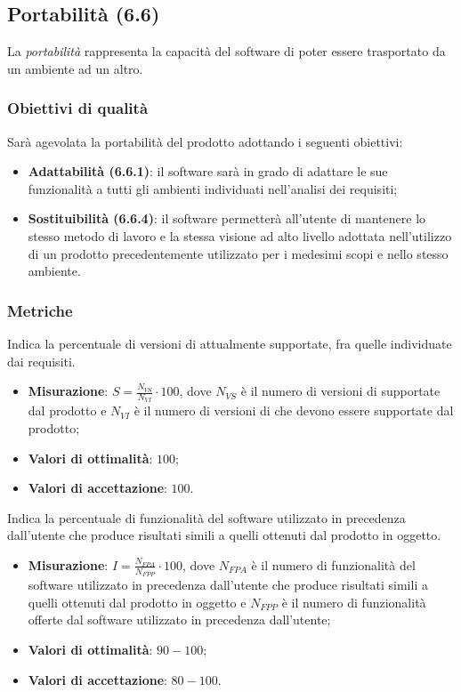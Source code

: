 \subsection{Portabilità (6.6)}
\label{portabilita}
La \emph{portabilità} rappresenta la capacità del software di poter essere trasportato da un ambiente ad un altro.
\subsubsection{Obiettivi di qualità}
Sarà agevolata la portabilità del prodotto adottando i seguenti obiettivi:
\begin{itemize}
\item \textbf{Adattabilità (6.6.1)}: il software sarà in grado di adattare le sue funzionalità a tutti gli ambienti individuati nell'analisi dei requisiti;
\item \textbf{Sostituibilità (6.6.4)}: il software permetterà all'utente di mantenere lo stesso metodo di lavoro e la stessa visione ad alto livello adottata nell'utilizzo di un prodotto precedentemente utilizzato per i medesimi scopi e nello stesso ambiente.
\end{itemize}
\subsubsection{Metriche}
\label{versioniBrowserSupp}
Indica la percentuale di versioni di  attualmente supportate, fra quelle individuate dai requisiti.
\begin{itemize}
\item \textbf{Misurazione}: $S=\frac{N_{VS}}{N_{VI}} \cdot 100$, dove $N_{VS}$ è il numero di versioni di  supportate dal prodotto e $N_{VI}$ è il numero di versioni di  che devono essere supportate dal prodotto;
\item \textbf{Valori di ottimalità}: $100$;
\item \textbf{Valori di accettazione}: $100$.
\end{itemize}
\label{inclFunzAltriProd}
Indica la percentuale di funzionalità del software utilizzato in precedenza dall'utente che produce risultati simili a quelli ottenuti dal prodotto in oggetto.
\begin{itemize}
\item \textbf{Misurazione}: $I=\frac{N_{FPA}}{N_{FPP}} \cdot 100$, dove $N_{FPA}$ è il numero di funzionalità del software utilizzato in precedenza dall'utente che produce risultati simili a quelli ottenuti dal prodotto in oggetto e $N_{FPP}$ è il numero di funzionalità offerte dal software utilizzato in precedenza dall'utente;
\item \textbf{Valori di ottimalità}: $90 - 100$;
\item \textbf{Valori di accettazione}: $80 - 100$.
\end{itemize}
